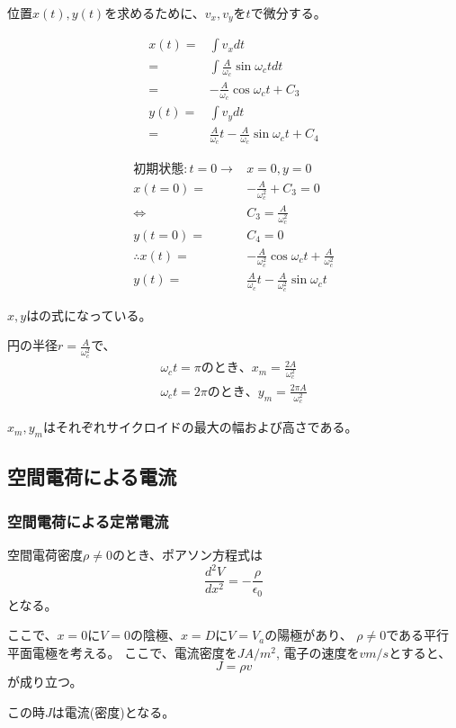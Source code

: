 \documentclass[12pt]{ltjsarticle}
\newcommand{\ds}{\displaystyle}
\begin{document}
位置$x(t),y(t)$を求めるために、$v_x,v_y$を$t$で微分する。

\begin{align*}
x(t)=&\int v_x dt\\
=&\int \frac {A}{\omega_c}\sin{\omega_ct}dt\\
=&-\frac{A}{\omega_c}\cos{\omega_ct}+C_3\\
y(t)=&\int v_y dt\\
=&\frac{A}{\omega_c}t-\frac{A}{\omega_c}\sin{\omega_ct}+C_4
\end{align*}

\begin{align*}
初期状態:t=0\rightarrow &x=0, y=0\\
x(t=0)=&-\frac{A}{\omega_c^2}+C_3=0\\
\Leftrightarrow &C_3=\frac{A}{\omega_c^2}\\
y(t=0)=&C_4=0\\
\therefore x(t)=&-\frac{A}{\omega_c^2}\cos{\omega_ct}
+\frac{A}{\omega_c^2}\\
y(t)=&\frac{A}{\omega_c}t-\frac{A}{\omega_c^2}\sin{\omega_ct}
\end{align*}

$x,y$はの式になっている。

円の半径$\ds r=\frac{A}{\omega_c^2}$で、
\begin{align*}
\omega_ct=\pi のとき、x_m=\frac{2A}{\omega_c^2}\\
\omega_ct=2\pi のとき、y_m=\frac{2\pi A}{\omega_c^2}
\end{align*}

$x_m,y_m$はそれぞれサイクロイドの最大の幅および高さである。

\clearpage
\subsection{空間電荷による電流}
\subsubsection{空間電荷による定常電流}

空間電荷密度$\rho\ne 0$のとき、ポアソン方程式は
\[\frac{d^2V}{dx^2}=-\frac{\rho}{\epsilon_0}\]
となる。

ここで、$x=0$に$V=0$の陰極、$x=D$に$V=V_a$の陽極があり、
$\rho\ne 0$である平行平面電極を考える。
ここで、電流密度を$J\unit{A/m^2}$, 電子の速度を$v\unit{m/s}$とすると、
\[J=\rho v\]
が成り立つ。

この時$J$は電流(密度)となる。
\end{document}
